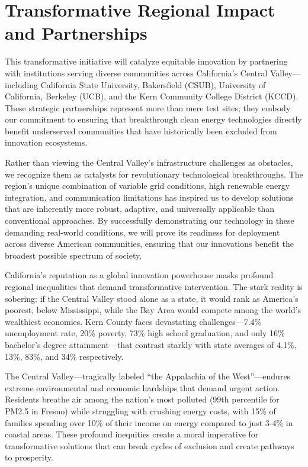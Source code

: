 \documentclass[12pt]{article}
\begin{document}
\section{Transformative Regional Impact and Partnerships}

This transformative initiative will catalyze equitable innovation by partnering with institutions serving diverse communities across California's Central Valley---including California State University, Bakersfield (CSUB), University of California, Berkeley (UCB), and the Kern Community College District (KCCD). These strategic partnerships represent more than mere test sites; they embody our commitment to ensuring that breakthrough clean energy technologies directly benefit underserved communities that have historically been excluded from innovation ecosystems.

Rather than viewing the Central Valley's infrastructure challenges as obstacles, we recognize them as catalysts for revolutionary technological breakthroughs. The region's unique combination of variable grid conditions, high renewable energy integration, and communication limitations has inspired us to develop solutions that are inherently more robust, adaptive, and universally applicable than conventional approaches. By successfully demonstrating our technology in these demanding real-world conditions, we will prove its readiness for deployment across diverse American communities, ensuring that our innovations benefit the broadest possible spectrum of society.

California's reputation as a global innovation powerhouse masks profound regional inequalities that demand transformative intervention. The stark reality is sobering: if the Central Valley stood alone as a state, it would rank as America's poorest, below Mississippi, while the Bay Area would compete among the world's wealthiest economies. Kern County faces devastating challenges---7.4\% unemployment rate, 20\% poverty, 73\% high school graduation, and only 16\% bachelor's degree attainment---that contrast starkly with state averages of 4.1\%, 13\%, 83\%, and 34\% respectively.

The Central Valley---tragically labeled ``the Appalachia of the West''---endures extreme environmental and economic hardships that demand urgent action. Residents breathe air among the nation's most polluted (99th percentile for PM2.5 in Fresno) while struggling with crushing energy costs, with 15\% of families spending over 10\% of their income on energy compared to just 3-4\% in coastal areas. These profound inequities create a moral imperative for transformative solutions that can break cycles of exclusion and create pathways to prosperity.
\end{document}
